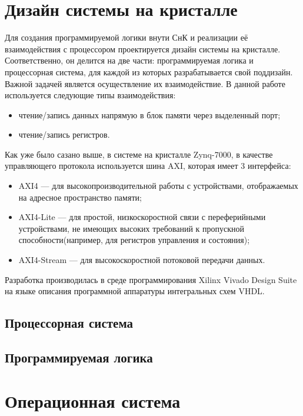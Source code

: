 \documentclass[a4paper, 14pt]{extarticle}
\begin{document}
\section{Дизайн системы на кристалле}
    Для создания программируемой логики внути СнК и реализации её взаимодействия с процессором проектируется дизайн системы на кристалле. Соответственно, он делится на две части: программируемая логика и процессорная система, для каждой из которых разрабатывается свой поддизайн. Важной задачей является осуществление их взаимодействие. В данной работе используется следующие типы взаимодействия:
    \begin{itemize}
        \item чтение/запись данных напрямую в блок памяти через выделенный порт;
        \item чтение/запись регистров.
    \end{itemize}\par
    Как уже было сазано выше, в системе на кристалле Zynq-7000, в качестве управляющего протокола используется шина AXI, которая имеет 3 интерфейса:
    \begin{itemize}
        \item AXI4 --- для высокопроизводительной работы с устройствами, отображаемых на адресное пространство памяти;
        \item AXI4-Lite --- для простой, низкоскоростной связи с переферийными устройствами, не имеющих высоких требований к пропускной способности(например, для регистров управления и состояния);
        \item AXI4-Stream --- для высокоскоростной потоковой передачи данных.
    \end{itemize}\par
    Разработка производилась в среде программирования Xilinx Vivado Design Suite на языке описания программной аппаратуры интегральных схем VHDL.
    
    \subsection{Процессорная система}
    
    \subsection{Программируемая логика}
    \newpage

\section{Операционная система}
\newpage
\end{document}
